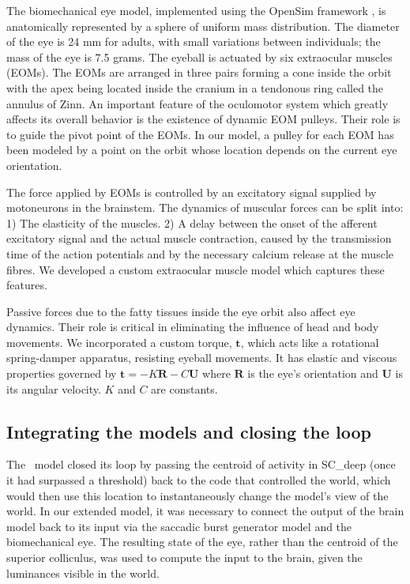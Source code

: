 \documentclass{frontiersSCNS}
\begin{document}


The biomechanical eye model, implemented using the OpenSim framework
\cite{seth_opensim:_2011}, is anatomically represented by a sphere of
uniform mass distribution. The diameter of the eye is 24 mm for adults,
with small variations between individuals; the mass of the eye is 7.5 grams.
The eyeball is actuated by six extraocular muscles
(EOMs). The EOMs are arranged in three pairs forming a cone inside the
orbit with the apex being located inside the cranium in a tendonous
ring called the annulus of Zinn. An important feature of the
oculomotor system which greatly affects its overall behavior is the
existence of dynamic EOM pulleys. Their role is to guide the pivot
point of the EOMs. In our model, a pulley for each EOM has been
modeled by a point on the orbit whose location depends on the current
eye orientation.

The force applied by EOMs is controlled by an excitatory signal
supplied by motoneurons in the brainstem. The dynamics of muscular
forces can be split into: 1) The elasticity of the muscles. 2) A delay
between the onset of the afferent excitatory signal and the actual
muscle contraction, caused by the transmission time of the action
potentials and by the necessary calcium release at the muscle
fibres. We developed a custom extraocular muscle model which captures
these features.

Passive forces due to the fatty tissues inside the eye orbit also
affect eye dynamics. Their role is critical in eliminating the
influence of head and body movements. We incorporated a custom torque, $\mathbf{t}$,
which acts like a rotational spring-damper apparatus, resisting
eyeball movements. It has elastic and viscous properties governed by
$\mathbf{t} = -K\mathbf{R}-C\mathbf{U}$ where $\mathbf{R}$ is the
eye's orientation and $\mathbf{U}$ is its angular velocity. $K$ and
$C$ are constants.

\subsection{Integrating the models and closing the loop}

The \ccg~model closed its loop by passing the centroid of activity in
SC\_deep (once it had surpassed a threshold) back to the code that
controlled the world, which would then use this location to
instantaneously change the model's view of the world. In our extended
model, it was necessary to connect the output of the brain model back
to its input via the saccadic burst generator model and the
biomechanical eye. The resulting state of the eye, rather than the
centroid of the superior colliculus, was used to compute the input to
the brain, given the luminances visible in the world.
\end{document}
